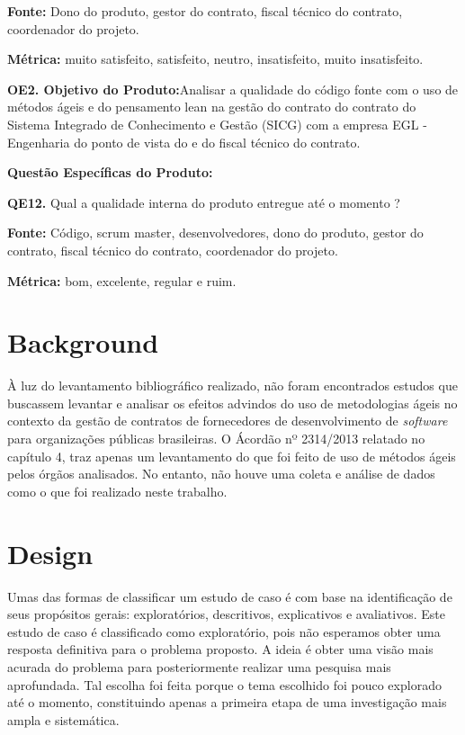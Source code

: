 \textbf{Fonte:} Dono do produto, gestor do contrato, fiscal técnico do contrato, coordenador do projeto.

\textbf{Métrica:} muito satisfeito, satisfeito, neutro, insatisfeito, muito insatisfeito.
 
 \vspace{\onelineskip} 

\textbf{OE2. Objetivo do Produto:}Analisar a qualidade do código fonte com o uso de métodos ágeis e do pensamento lean na gestão do contrato do contrato do Sistema Integrado 
de Conhecimento e Gestão (SICG) com a empresa EGL - Engenharia do ponto de vista do  e do fiscal técnico do contrato.

\textbf{Questão Específicas do Produto:}

\textbf{QE12.} Qual a qualidade interna do produto entregue até o momento ?

\textbf{Fonte:} Código, scrum master, desenvolvedores, dono do produto, gestor do contrato, fiscal técnico do contrato, coordenador do projeto.

\textbf{Métrica:} bom, excelente, regular e ruim.


\section[Background]{Background}

À luz do levantamento bibliográfico realizado, não foram encontrados estudos que buscassem levantar e analisar os efeitos advindos do uso de metodologias ágeis no contexto da gestão de contratos de fornecedores de desenvolvimento de \textit{software} para organizações públicas brasileiras. O Ácordão nº 2314/2013 relatado no capítulo 4, traz apenas um levantamento do que foi feito de uso de métodos ágeis pelos órgãos analisados. No entanto, não houve uma coleta e análise de dados como  o que foi realizado neste trabalho.

\section[Design]{Design}

Umas das formas de classificar um estudo de caso é com base na identificação de seus propósitos gerais: exploratórios, descritivos, explicativos e avaliativos. Este estudo de caso é classificado como exploratório, pois não esperamos obter uma resposta definitiva para o problema proposto. A ideia é obter uma visão mais acurada do problema para posteriormente realizar uma pesquisa mais aprofundada. Tal escolha foi feita porque o tema escolhido foi pouco explorado até o momento, constituindo apenas a primeira etapa de uma investigação mais ampla e sistemática. 


